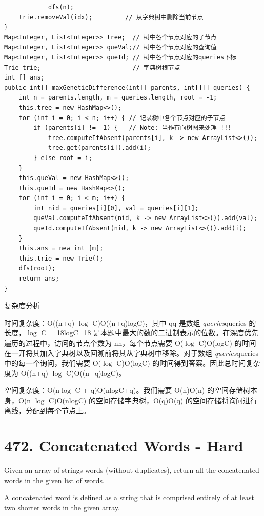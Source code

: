 \documentclass[9pt, b5paaper]{book}
\begin{document}
\begin{verbatim}
            dfs(n);
    trie.removeVal(idx);         // 从字典树中删除当前节点
}
Map<Integer, List<Integer>> tree;  // 树中各个节点对应的子节点
Map<Integer, List<Integer>> queVal;// 树中各个节点对应的查询值
Map<Integer, List<Integer>> queId; // 树中各个节点对应的queries下标
Trie trie;                         // 字典树根节点
int [] ans;
public int[] maxGeneticDifference(int[] parents, int[][] queries) {
    int n = parents.length, m = queries.length, root = -1;
    this.tree = new HashMap<>();
    for (int i = 0; i < n; i++) { // 记录树中各个节点对应的子节点
        if (parents[i] != -1) {   // Note: 当作有向树图来处理 !!!
            tree.computeIfAbsent(parents[i], k -> new ArrayList<>());
            tree.get(parents[i]).add(i);
        } else root = i;  
    }
    this.queVal = new HashMap<>();
    this.queId = new HashMap<>();
    for (int i = 0; i < m; i++) {
        int nid = queries[i][0], val = queries[i][1];
        queVal.computeIfAbsent(nid, k -> new ArrayList<>()).add(val);
        queId.computeIfAbsent(nid, k -> new ArrayList<>()).add(i);
    }
    this.ans = new int [m];
    this.trie = new Trie();
    dfs(root);
    return ans;
}
\end{verbatim}

复杂度分析

时间复杂度：O((n+q) $\log$ C)O((n+q)logC)，其中 qq 是数组 \textit{queries}queries 的长度，$\log$ C = 18logC=18 是本题中最大的数的二进制表示的位数。在深度优先遍历的过程中，访问的节点个数为 nn，每个节点需要 O($\log$ C)O(logC) 的时间在一开将其加入字典树以及回溯前将其从字典树中移除。对于数组 \textit{queries}queries 中的每一个询问，我们需要 O($\log$ C)O(logC) 的时间得到答案。因此总时间复杂度为 O((n+q) $\log$ C)O((n+q)logC)。

空间复杂度：O(n$\log$ C + q)O(nlogC+q)。我们需要 O(n)O(n) 的空间存储树本身，O(n $\log$ C)O(nlogC) 的空间存储字典树，O(q)O(q) 的空间存储将询问进行离线，分配到每个节点上。

\section{472. Concatenated Words - Hard}
\label{sec-9-8}
Given an array of strings words (without duplicates), return all the concatenated words in the given list of words.

A concatenated word is defined as a string that is comprised entirely of at least two shorter words in the given array.
\end{document}
